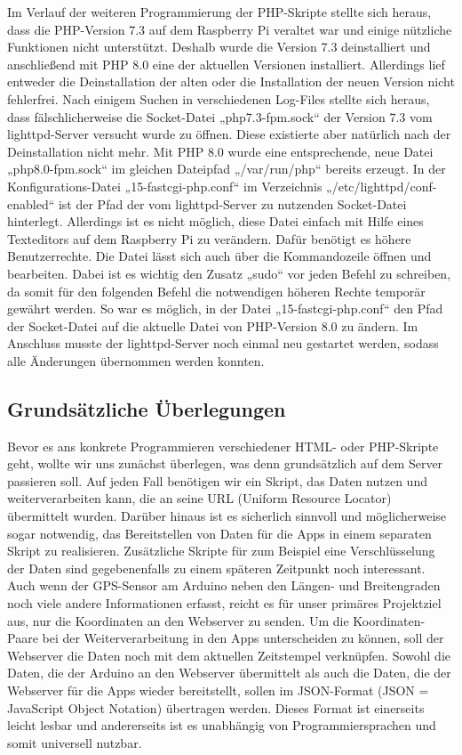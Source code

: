 Im Verlauf der weiteren Programmierung der PHP-Skripte stellte sich heraus, dass die PHP-Version 7.3 auf dem Raspberry Pi veraltet war und einige nützliche Funktionen nicht unterstützt. Deshalb wurde die Version 7.3 deinstalliert und anschließend mit PHP 8.0 eine der aktuellen Versionen installiert. Allerdings lief entweder die Deinstallation der alten oder die Installation der neuen Version nicht fehlerfrei. Nach einigem Suchen in verschiedenen Log-Files stellte sich heraus, dass fälschlicherweise die Socket-Datei „php7.3-fpm.sock“ der Version 7.3 vom lighttpd-Server versucht wurde zu öffnen. Diese existierte aber natürlich nach der Deinstallation nicht mehr. Mit PHP 8.0 wurde eine entsprechende, neue Datei „php8.0-fpm.sock“ im gleichen Dateipfad „/var/run/php“ bereits erzeugt. In der Konfigurations-Datei „15-fastcgi-php.conf“ im Verzeichnis „/etc/lighttpd/conf-enabled“ ist der Pfad der vom lighttpd-Server zu nutzenden Socket-Datei hinterlegt. Allerdings ist es nicht möglich, diese Datei einfach mit Hilfe eines Texteditors auf dem Raspberry Pi zu verändern. Dafür benötigt es höhere Benutzerrechte. Die Datei lässt sich auch über die Kommandozeile öffnen und bearbeiten. Dabei ist es wichtig den Zusatz „sudo“ vor jeden Befehl zu schreiben, da somit für den folgenden Befehl die notwendigen höheren Rechte temporär gewährt werden. So war es möglich, in der Datei „15-fastcgi-php.conf“ den Pfad der Socket-Datei auf die aktuelle Datei von PHP-Version 8.0 zu ändern. Im Anschluss musste der lighttpd-Server noch einmal neu gestartet werden, sodass alle Änderungen übernommen werden konnten.

\subsection{Grundsätzliche Überlegungen}
Bevor es ans konkrete Programmieren verschiedener HTML- oder PHP-Skripte geht, wollte wir uns zunächst überlegen, was denn grundsätzlich auf dem Server passieren soll. Auf jeden Fall benötigen wir ein Skript, das Daten nutzen und weiterverarbeiten kann, die an seine URL (Uniform Resource Locator) übermittelt wurden. Darüber hinaus ist es sicherlich sinnvoll und möglicherweise sogar notwendig, das Bereitstellen von Daten für die Apps in einem separaten Skript zu realisieren. Zusätzliche Skripte für zum Beispiel eine Verschlüsselung der Daten sind gegebenenfalls zu einem späteren Zeitpunkt noch interessant.
Auch wenn der GPS-Sensor am Arduino neben den Längen- und Breitengraden noch viele andere Informationen erfasst, reicht es für unser primäres Projektziel aus, nur die Koordinaten an den Webserver zu senden. Um die Koordinaten-Paare bei der Weiterverarbeitung in den Apps unterscheiden zu können, soll der Webserver die Daten noch mit dem aktuellen Zeitstempel verknüpfen.
Sowohl die Daten, die der Arduino an den Webserver übermittelt als auch die Daten, die der Webserver für die Apps wieder bereitstellt, sollen im JSON-Format (JSON = JavaScript Object Notation) übertragen werden. Dieses Format ist einerseits leicht lesbar und andererseits ist es unabhängig von Programmiersprachen und somit universell nutzbar.

